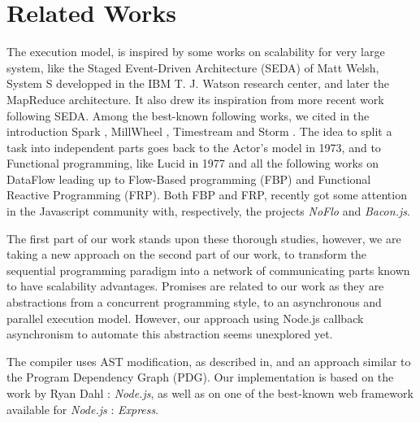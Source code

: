 \section{Related Works} \label{section:related}

The execution model, is inspired by some works on scalability for very large system, like the Staged Event-Driven Architecture (SEDA) of Matt Welsh\cite{Welsh2000}, System S developped in the IBM T. J. Watson research center\cite{Jain2006,Wu2007}, and later the MapReduce architecture\cite{Dean2008}.
It also drew its inspiration from more recent work following SEDA.
Among the best-known following works, we cited in the introduction Spark \cite{Zaharia2010, Zaharia2012}, MillWheel \cite{Akidau2013}, Timestream \cite{Qian2013} and Storm \cite{Marz2011}.
The idea to split a task into independent parts goes back to the Actor's model\cite{Hewitt1973} in 1973, and to Functional programming, like Lucid\cite{Ashcroft1977} in 1977 and all the following works on DataFlow leading up to Flow-Based programming (FBP)\cite{Morrison1994a} and Functional Reactive Programming (FRP)\cite{Elliott1997}.
Both FBP and FRP, recently got some attention in the Javascript community with, respectively, the projects \textit{NoFlo}\cite{NoFlo} and \textit{Bacon.js}\cite{Paananen2012}.

The first part of our work stands upon these thorough studies, however, we are taking a new approach on the second part of our work, to transform the sequential programming paradigm into a network of communicating parts known to have scalability advantages.
Promises\cite{Liskov1988} are related to our work as they are abstractions from a concurrent programming style, to an asynchronous and parallel execution model.
However, our approach using Node.js callback asynchronism to automate this abstraction seems unexplored yet.

The compiler uses AST modification, as described in\cite{Jones2003}, and an approach similar to the Program Dependency Graph (PDG)\cite{Ferrante1987}.
Our implementation is based on the work by Ryan Dahl : \textit{Node.js}\cite{Dahl}, as well as on one of the best-known web framework available for \textit{Node.js} : \textit{Express}\cite{express}.